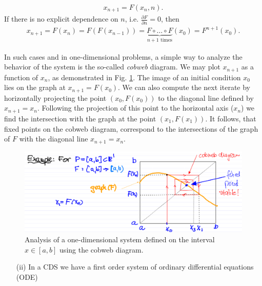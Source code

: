 	\begin{align}
		\boxed{x_{n+1} = F(x_n , n).}	
	\end{align}
	If there is no explicit dependence on $n$, i.e. $\frac{\partial F}{\partial n} = 0$, then 
	\begin{align}
		\boxed{ x_{n+1}= F(x_n) = F(F(x_{n-1})) = \underbrace{F \circ \ldots \circ F}_{n+1 \textrm{ times} }(x_0) = F^{n+1}(x_0).}
	\end{align}

\begin{ex}

	In such cases and in one-dimensional problems, a simple way to analyze the behavior of the system is the so-called {\em cobweb} diagram. We may plot $x_{n+1}$ as a function of $x_{n}$, as demonstrated in Fig. \ref{fig:intro:1}. The image of an initial condition $x_0$ lies on the graph at $x_{n+1}=F(x_0)$. We can also compute the next iterate by horizontally projecting the point $(x_0, F(x_0))$ to the diagonal line defined by $x_{n+1}= x_n$. Following the projection of this point to the horizontal axis ($x_n$) we find the intersection with the graph at the point $(x_1, F(x_1))$.  It follows, that fixed points on the cobweb diagram, correspond to the intersections of the graph of $F$ with the diagonal line $x_{n+1} = x_n$. 
	\end{ex}

	\begin{figure}[H]
	\centering
	\includegraphics[width = \textwidth]{figures/intro/1DDS.png}
	\caption{Analysis of a one-dimensional system defined on the interval $x\in[a,b]$ using the cobweb diagram.}
		\label{fig:intro:1}
\end{figure}
\begin{enumerate}
\item[(ii)] In a CDS we have a first order system of ordinary differential equations (ODE)
\end{enumerate}

